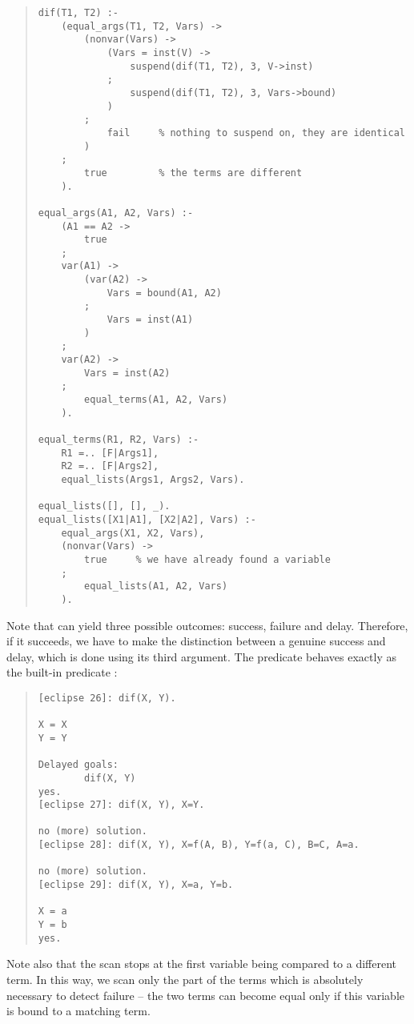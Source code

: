 \begin{quote}
\begin{verbatim}
dif(T1, T2) :-
    (equal_args(T1, T2, Vars) ->
        (nonvar(Vars) ->
            (Vars = inst(V) ->
                suspend(dif(T1, T2), 3, V->inst)
            ;
                suspend(dif(T1, T2), 3, Vars->bound)
            )
        ;
            fail     % nothing to suspend on, they are identical
        )
    ;
        true         % the terms are different
    ).

equal_args(A1, A2, Vars) :-
    (A1 == A2 ->
        true
    ;
    var(A1) ->
        (var(A2) ->
            Vars = bound(A1, A2)
        ;
            Vars = inst(A1)
        )
    ;
    var(A2) ->
        Vars = inst(A2)
    ;
        equal_terms(A1, A2, Vars)
    ).

equal_terms(R1, R2, Vars) :-
    R1 =.. [F|Args1],
    R2 =.. [F|Args2],
    equal_lists(Args1, Args2, Vars).

equal_lists([], [], _).
equal_lists([X1|A1], [X2|A2], Vars) :-
    equal_args(X1, X2, Vars),
    (nonvar(Vars) ->
        true     % we have already found a variable
    ;
        equal_lists(A1, A2, Vars)
    ).
\end{verbatim}
\end{quote}

Note that  can yield three possible outcomes:
success, failure and delay.
Therefore, if it succeeds,
we have to make the distinction between a genuine success
and delay, which is done using its third argument.
The predicate  behaves
exactly as the built-in predicate :

\begin{quote}
\begin{verbatim}
[eclipse 26]: dif(X, Y).

X = X
Y = Y

Delayed goals:
        dif(X, Y)
yes.
[eclipse 27]: dif(X, Y), X=Y.

no (more) solution.
[eclipse 28]: dif(X, Y), X=f(A, B), Y=f(a, C), B=C, A=a.

no (more) solution.
[eclipse 29]: dif(X, Y), X=a, Y=b.

X = a
Y = b
yes.
\end{verbatim}
\end{quote}

Note also that the scan stops at the first variable being compared
to a different term.
In this way, we scan only the part of the terms which is absolutely
necessary to detect failure -- the two terms can become
equal only if this variable is bound to a matching term.

